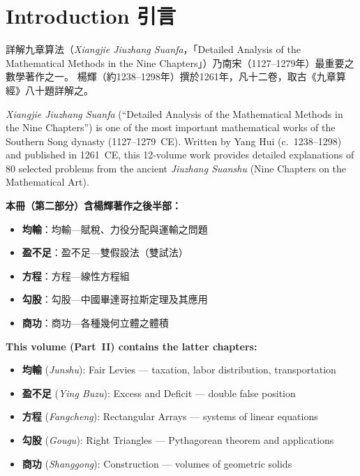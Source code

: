 \documentclass[11pt,a4paper]{article}
\newcommand{\zh}[1]{{\CJKfamily{\CJKrmdefault} #1}}
\newenvironment{chside}{%
  \begin{minipage}[t]{0.48\textwidth}%
  \setlength{\parindent}{1.5em}%
  \linespread{1.25}\selectfont%
  \small%
}{%
  \end{minipage}%
}
\newenvironment{enside}{%
  \hfill\begin{minipage}[t]{0.48\textwidth}%
  \setlength{\parindent}{1em}%
  \linespread{1.15}\selectfont%
  \small%
}{%
  \end{minipage}%
}
\begin{document}
\section*{Introduction \zh{引言}}
\addcontentsline{toc}{section}{Introduction \zh{引言}}

\noindent\begin{chside}
\zh{詳解九章算法}（\textit{Xiangjie Jiuzhang Suanfa}，「Detailed Analysis of
the Mathematical Methods in the Nine Chapters」）乃南宋（1127--1279年）最重要之數學著作之一。\zh{楊輝}（約1238--1298年）撰於1261年，凡十二卷，取古《九章算經》八十題詳解之。
\end{chside}%
\begin{enside}
\textit{Xiangjie Jiuzhang Suanfa} (``Detailed Analysis of the Mathematical
Methods in the Nine Chapters'') is one of the most important mathematical
works of the Southern Song dynasty (1127--1279~CE). Written by Yang Hui
(c.~1238--1298) and published in 1261~CE, this 12-volume work provides
detailed explanations of 80 selected problems from the ancient
\textit{Jiuzhang Suanshu} (Nine Chapters on the Mathematical Art).
\end{enside}

\medskip

\noindent\begin{chside}
\textbf{本冊（第二部分）含楊輝著作之後半部：}
\begin{itemize}[leftmargin=1em,topsep=0pt,itemsep=1pt]
  \item \textbf{\zh{均輸}}：均輸---賦稅、力役分配與運輸之問題
  \item \textbf{\zh{盈不足}}：盈不足---雙假設法（雙試法）
  \item \textbf{\zh{方程}}：方程---線性方程組
  \item \textbf{\zh{勾股}}：勾股---中國畢達哥拉斯定理及其應用
  \item \textbf{\zh{商功}}：商功---各種幾何立體之體積
\end{itemize}
\end{chside}%
\begin{enside}
\textbf{This volume (Part~II) contains the latter chapters:}
\begin{itemize}[leftmargin=1em,topsep=0pt,itemsep=1pt]
  \item \textbf{\zh{均輸}} (\textit{Junshu}): Fair Levies --- taxation, labor distribution, transportation
  \item \textbf{\zh{盈不足}} (\textit{Ying Buzu}): Excess and Deficit --- double false position
  \item \textbf{\zh{方程}} (\textit{Fangcheng}): Rectangular Arrays --- systems of linear equations
  \item \textbf{\zh{勾股}} (\textit{Gougu}): Right Triangles --- Pythagorean theorem and applications
  \item \textbf{\zh{商功}} (\textit{Shanggong}): Construction --- volumes of geometric solids
\end{itemize}
\end{enside}
\end{document}
